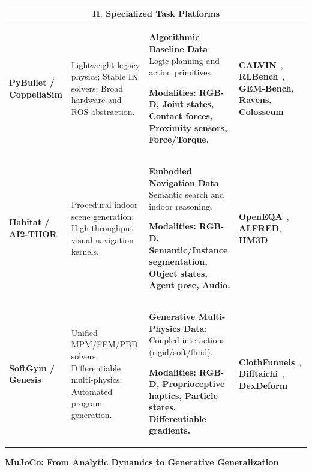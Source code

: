 \documentclass[acmsmall,screen,review,anonymous]{acmart}
\begin{document}
\begin{table}[t]
{\begin{tabular}{@{}l p{4.2cm} p{5.8cm} p{5.5cm}@{}}
\midrule

\multicolumn{4}{c}{\textbf{\textbf{II\@. Specialized Task Platforms}}} \\
\midrule
\addlinespace[0.5ex]
\textbf{PyBullet / CoppeliaSim} & Lightweight legacy physics; Stable IK solvers; Broad hardware and ROS abstraction. & \textbf{Algorithmic Baseline Data}: Logic planning and action primitives. 

\textbf{Modalities: RGB-D, Joint states, Contact forces, Proximity sensors, Force/Torque.} & \textbf{CALVIN}~\cite{mees2022calvin}, \textbf{RLBench}~\cite{james2020rlbench}, \textbf{GEM-Bench}, \textbf{Ravens}, \textbf{Colosseum} \\ \addlinespace

\textbf{Habitat / AI2-THOR} & Procedural indoor scene generation; High-throughput visual navigation kernels. & \textbf{Embodied Navigation Data}: Semantic search and indoor reasoning. 

\textbf{Modalities: RGB-D, Semantic/Instance segmentation, Object states, Agent pose, Audio.} & \textbf{OpenEQA}~\cite{majumdar2024openeqa}, \textbf{ALFRED}, \textbf{HM3D} \\ \addlinespace

\textbf{SoftGym / Genesis} & Unified MPM/FEM/PBD solvers; Differentiable multi-physics; Automated program generation. & \textbf{Generative Multi-Physics Data}: Coupled interactions (rigid/soft/fluid). 

\textbf{Modalities: RGB-D, Proprioceptive haptics, Particle states, Differentiable gradients.} & \textbf{ClothFunnels}~\cite{canberk2022clothfunnels}, \textbf{Difftaichi}~\cite{hu2020difftaichi}, \textbf{DexDeform}~\cite{li2023dexdeform} \\
\bottomrule
\end{tabular}%
}
\end{table}

\textbf{MuJoCo\@: From Analytic Dynamics to Generative Generalization}
\end{document}
